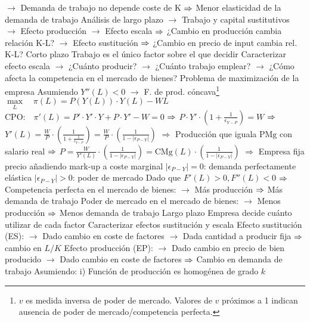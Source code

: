 \documentclass{nuevotema}
\begin{document}
\begin{esquemal}
				\4[] $\to$ Demanda de trabajo no depende coste de K
				\4[] $\Rightarrow$ Menor elasticidad de la demanda de trabajo
				\4[] Análisis de largo plazo
				\4[] $\to$ Trabajo y capital sustitutivos
				\4[] $\to$ Efecto producción
				\4[] $\to$ Efecto escala
				\4[] $\Rightarrow$ ¿Cambio en producción cambia relación K-L?
				\4[] $\to$ Efecto sustitución
				\4[] $\Rightarrow$ ¿Cambio en precio de input cambia rel. K-L?
			\3 Corto plazo
				\4 Trabajo es el único factor sobre el que decidir
				\4 Caracterizar efecto escala
				\4[] $\to$ ¿Cuánto producir?
				\4[] $\to$ ¿Cuánto trabajo emplear?
				\4[] $\to$ ¿Cómo afecta la competencia en el mercado de bienes?
				\4 Problema de maximización de la empresa
				\4[] Asumiendo $Y''(L) < 0$ $\to$ F. de prod. cóncava\footnote{$v$ es medida inversa de poder de mercado. Valores de $v$ próximos a 1 indican ausencia de poder de mercado/competencia perfecta.}
				\4[] $\underset{L}{\max} \quad \pi(L) = P(Y(L)) \cdot Y(L) - W L$
				\4[] $\text{CPO:} \quad \pi'(L) = P' \cdot Y' \cdot Y + P \cdot Y'-W = 0$
				\4[] $\Rightarrow$ $P\cdot Y'\cdot \left( 1+\frac{1}{\epsilon_{Y-P}} \right) = W$
				\4[] $\Rightarrow$ $ Y'(L) = \frac{W}{P} \cdot \left( \frac{1}{1+\frac{1}{\epsilon_{Y-P}} } \right) = \frac{W}{P} \cdot \left( \frac{1}{1-|\epsilon_{P-Y}|} \right) $
				\4[] $\Rightarrow$ Producción que iguala $\text{PMg}$ con salario real
				\4[] $\Rightarrow$ $P = \frac{W}{Y'(L)} \cdot \left( \frac{1}{1-|\epsilon_{P-Y}|} \right) = \text{CMg}(L) \cdot \left( \frac{1}{1-|\epsilon_{P-Y}|} \right) $
				\4[] $\Rightarrow$ Empresa fija precio añadiendo mark-up a coste marginal
				\4[] $|\epsilon_{P-Y}| = 0$: demanda perfectamente elástica
				\4[] $|\epsilon_{P-Y}| > 0$: poder de mercado
				\4[] Dado que $F'(L) > 0, F''(L) < 0$
				\4[] $\Rightarrow$ 
				\4 Competencia perfecta en el mercado de bienes:
				\4[] $\to$ Más producción
				\4[] $\Rightarrow$ Más demanda de trabajo
				\4 Poder de mercado en el mercado de bienes:
				\4[] $\to$ Menos producción
				\4[] $\Rightarrow$ Menos demanda de trabajo
			\3 Largo plazo
				\4 Empresa decide cuánto utilizar de cada factor
				\4 Caracterizar efectos sustitución y escala
				\4[] Efecto sustitución (ES):
				\4[] $\to$ Dado cambio en coste de factores
				\4[] $\to$ Dada cantidad a producir fija
				\4[] $\Rightarrow$ cambio en $L/K$
				\4[] Efecto producción (EP):
				\4[] $\to$ Dado cambio en precio de bien producido
				\4[] $\to$ Dado cambio en coste de factores
				\4[] $\Rightarrow$ Cambio en demanda de trabajo
				\4 Asumiendo:
				\4[] i) Función de producción es homogénea de grado $k$

\end{esquemal}
\end{document}
